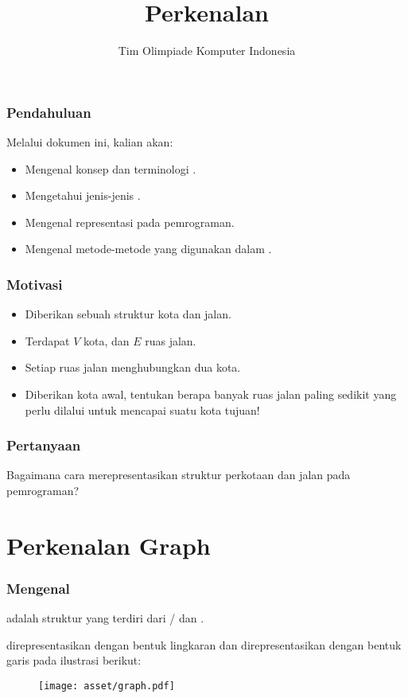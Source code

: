 

\title{Perkenalan \fGraph}
\author{Tim Olimpiade Komputer Indonesia}
\date{}

\usepackage{verbatim}
\usepackage{multicol}



\begin{frame}
\titlepage
\end{frame}

\begin{frame}
\frametitle{Pendahuluan}
Melalui dokumen ini, kalian akan:
\begin{itemize}
  \item Mengenal konsep dan terminologi \fgraph.
  \item Mengetahui jenis-jenis \fgraph.
  \item Mengenal representasi \fgraph pada pemrograman.
  \item Mengenal metode-metode yang digunakan dalam \fgraph.
\end{itemize}
\end{frame}

\begin{frame}
\frametitle{Motivasi}
\begin{itemize}
  \item Diberikan sebuah struktur kota dan jalan.
  \item Terdapat $V$ kota, dan $E$ ruas jalan.
  \item Setiap ruas jalan menghubungkan dua kota.
  \item Diberikan kota awal, tentukan berapa banyak ruas jalan paling sedikit yang perlu dilalui untuk mencapai suatu kota tujuan!
\end{itemize}
\end{frame}

\begin{frame}
\frametitle{Pertanyaan}
\begin{center}
  \large Bagaimana cara merepresentasikan struktur perkotaan dan jalan pada pemrograman?
\end{center}
\end{frame}

\section{Perkenalan Graph}
\frame{\sectionpage}

\begin{frame}
\frametitle{Mengenal \fGraph}
\fGraph adalah struktur yang terdiri dari \alert{\fnode/} dan \alert{\fedge.}\newline

\fNode direpresentasikan dengan bentuk lingkaran dan \fedge direpresentasikan dengan bentuk garis pada ilustrasi berikut:

\begin{figure}
  \centering
  \texttt{[image: asset/graph.pdf]}
\end{figure}
\end{frame}


